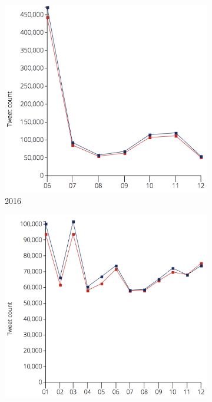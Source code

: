\documentclass[11pt]{report}
\begin{document}
\begin{figure}[H]
        \begin{subfigure}[b]{0.35\textwidth}
                \includegraphics[width=\linewidth]{images/2016-brexit.png}
                \caption{2016}
                \label{fig:gull}
        \end{subfigure}%
        \begin{subfigure}[b]{0.33\textwidth}
                \includegraphics[width=\linewidth]{images/2017-brexit.png}

\end{subfigure}
\end{figure}
\end{document}
